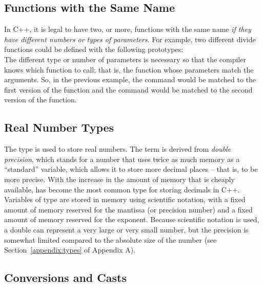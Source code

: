\subsection{Functions with the Same Name}

In C++, it is legal to have two, or more, functions with the same name \emph{if they have different numbers or types of parameters}.  For example, two different divide functions could be defined with the following prototypes:\\
The different type or number of parameters is necessary so that the compiler knows which function to call; that is, the function whose parameters match the arguments.  So, in the previous example, the command  would be matched to the first version of the function and the command  would be matched to the second version of the function.


\subsection{Real Number Types}

The  type is used to store real numbers.  The term  is derived from \emph{double precision}, which stands for a number that uses twice as much memory as a ``standard'' variable, which allows it to store more decimal places -- that is, to be more precise.  With the increase in the amount of memory that is cheaply available,  has become the most common type for storing decimals in C++. Variables of type  are stored in memory using scientific notation, with a fixed amount of memory reserved for the mantissa (or precision number) and a fixed amount of memory reserved for the exponent.  Because scientific notation is used, a double can represent a very large or very small number, but the precision is somewhat limited compared to the absolute size of the number (see Section~\ref{appendix:types} of Appendix A).  

\subsection{Conversions and Casts}

